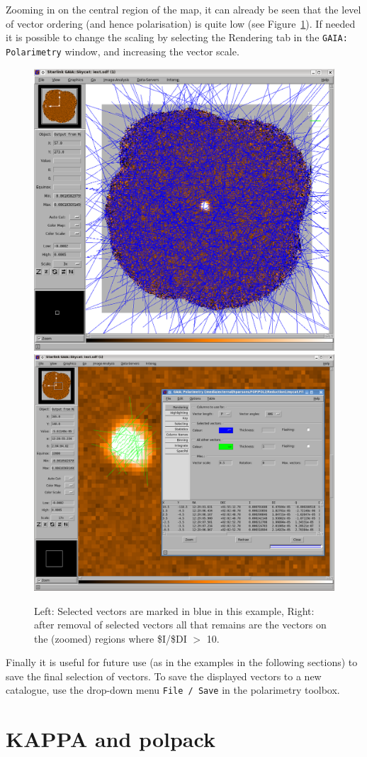 Zooming in on the central region of the map, it can already be seen
that the level of vector ordering (and hence polarisation) is quite
low (see Figure~\ref{fig:gaiavectorsfinal}). If needed it is
possible to change the scaling by selecting the Rendering tab in the
\texttt{GAIA: Polarimetry} window, and increasing the vector scale.


\begin{figure}[t!]
\begin{center}
\includegraphics[width=0.44\linewidth]{sc22-gaia-plot-vectors-5.png}
\includegraphics[width=0.52\linewidth]{sc22-gaia-plot-vectors-7.png}
\caption [Over Plotting Vectors in GAIA]{ Left: Selected vectors are
  marked in blue in this example, Right: after removal of selected
  vectors all that remains are the vectors on the (zoomed) regions
  where \$I/\$DI $>$ 10.}
\label{fig:gaiavectorsfinal}
\end{center}
\end{figure}


Finally it is useful for future use (as in the examples in the
following sections) to save the final selection of vectors. To save the
displayed vectors to a new catalogue, use the drop-down menu
\texttt{File / Save} in the polarimetry toolbox.

\section{KAPPA and polpack}

